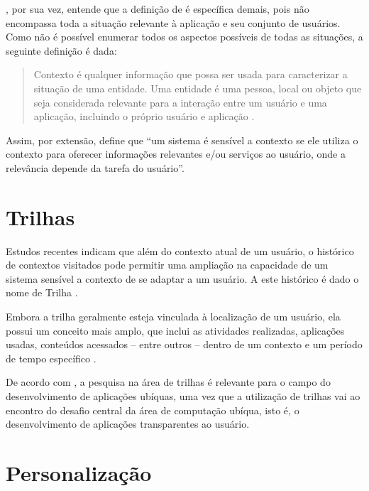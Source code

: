 , por sua vez, entende que a definição de  é específica demais, pois não encompassa toda a situação relevante à aplicação e seu conjunto de usuários. Como não é possível enumerar todos os aspectos possíveis de todas as situações, a seguinte definição é dada:

\begin{quotation}
Contexto é qualquer informação que possa ser usada para caracterizar a situação de uma entidade. Uma entidade é uma pessoa, local ou objeto que seja considerada relevante para a interação entre um usuário e uma aplicação, incluindo o próprio usuário e aplicação \cite{dey2001}.
\end{quotation}

Assim, por extensão,  define que ``um sistema é sensível a contexto se ele utiliza o contexto para oferecer informações relevantes e/ou serviços ao usuário, onde a relevância depende da tarefa do usuário''.


\section{Trilhas}
\label{sec:trilhas}

Estudos recentes indicam que além do contexto atual de um usuário, o histórico de contextos visitados pode permitir uma ampliação na capacidade de um sistema sensível a contexto de se adaptar a um usuário. A este histórico é dado o nome de Trilha \cite{silva10,driver08,clarke04}.

Embora a trilha geralmente esteja vinculada à localização de um usuário, ela possui um conceito mais amplo, que inclui as atividades realizadas, aplicações usadas, conteúdos acessados -- entre outros -- dentro de um contexto e um período de tempo específico \cite{silva10}.

De acordo com , a pesquisa na área de trilhas é relevante para o campo do desenvolvimento de aplicações ubíquas, uma vez que a utilização de trilhas vai ao encontro do desafio central da área de computação ubíqua, isto é, o desenvolvimento de aplicações transparentes ao usuário.


\section{Personalização}
\label{sec:personalizacao}

